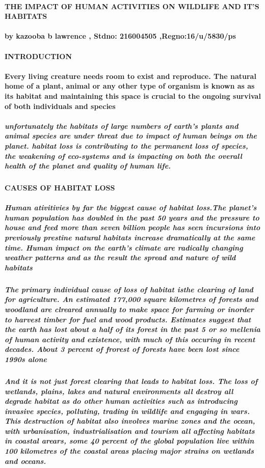 \documentclass[10pt]{article}
\begin{document}
 \paragraph{ THE IMPACT OF HUMAN ACTIVITIES ON WILDLIFE AND IT'S HABITATS }
\paragraph{by kazooba b lawrence , Stdno: 216004505 ,Regno:16/u/5830/ps}
\paragraph{INTRODUCTION}

\paragraph{Every living creature needs room to exist and reproduce. The natural home of a plant, animal or any other type of organism is known as as its habitat and maintaining this space is crucial to the ongoing survival of both individuals and species}\subparagraph{unfortunately the habitats of large numbers of earth's plants  and animal species are under threat due to impact of human beings on the planet. habitat loss is contributing to the permanent loss of species, the weakening of eco-systems and is impacting on both the overall health of the planet and quality of human life.}
\paragraph{CAUSES OF HABITAT LOSS}
\subparagraph{Human ativitivies   by far the biggest cause of habitat loss.The planet's human population  has doubled in the past 50 years and the pressure to house and feed more than seven billion people has seen incursions into previously prestine natural habitats increase dramatically at the same time. Human impact  on the earth's climate are radically changing weather patterns and as the result the spread and nature of wild habitats}
\subparagraph{The primary individual cause of loss of habitat isthe clearing of land for agriculture. An estimated 177,000 square kilometres of forests and woodland are clreared annually to make space for farming or inorder to harvest timber for fuel and wood products. Estimates suggest that the earth has lost about a half of its forest in the past  5 or so  mellenia of human activity and existence, with much of this occuring in recent decades. About 3 percent of frorest of forests have been lost since 1990s alone  }
\subparagraph{And it is not just forest clearing that leads to habitat loss. The loss of wetlands, plains, lakes and natural environments all destroy all degrade habitat as do other human activities such as introducing invasive species, polluting, trading in wildlife and engaging in wars. This destruction of habitat also involves marine zones and the ocean, with urbanisation, industrialisation and tourism all affecting habitats in coastal arears, some 40 percent of the global population live within 100 kilometres of the coastal areas placing major strains on wetlands and oceans. }
\end{document}
